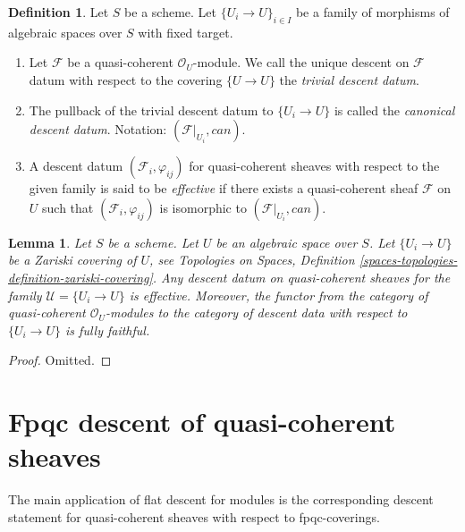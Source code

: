 \documentclass{stacks-project}
\theoremstyle{plain}
\newtheorem{lemma}[subsection]{Lemma}
\theoremstyle{definition}
\newtheorem{definition}[subsection]{Definition}
\theoremstyle{remark}
\numberwithin{equation}{subsection}
\begin{document}
\begin{definition}
\label{definition-descent-datum-effective-quasi-coherent}
Let $S$ be a scheme.
Let $\{U_i \to U\}_{i \in I}$ be a family of morphisms of algebraic
spaces over $S$ with fixed target.
\begin{enumerate}
\item Let $\mathcal{F}$ be a quasi-coherent $\mathcal{O}_U$-module.
We call the unique descent on $\mathcal{F}$ datum with respect to the covering
$\{U \to U\}$ the {\it trivial descent datum}.
\item The pullback of the trivial descent datum to
$\{U_i \to U\}$ is called the {\it canonical descent datum}.
Notation: $(\mathcal{F}|_{U_i}, can)$.
\item A descent datum $(\mathcal{F}_i, \varphi_{ij})$
for quasi-coherent sheaves with respect to the given family
is said to be {\it effective} if there exists a quasi-coherent
sheaf $\mathcal{F}$ on $U$ such that $(\mathcal{F}_i, \varphi_{ij})$
is isomorphic to $(\mathcal{F}|_{U_i}, can)$.
\end{enumerate}
\end{definition}

\begin{lemma}
\label{lemma-zariski-descent-effective}
Let $S$ be a scheme. Let $U$ be an algebraic space over $S$.
Let $\{U_i \to U\}$ be a Zariski covering of $U$, see
Topologies on Spaces,
Definition \ref{spaces-topologies-definition-zariski-covering}.
Any descent datum on quasi-coherent sheaves
for the family $\mathcal{U} = \{U_i \to U\}$ is
effective. Moreover, the functor from the category of
quasi-coherent $\mathcal{O}_U$-modules to the category
of descent data with respect to $\{U_i \to U\}$ is fully faithful.
\end{lemma}

\begin{proof}
Omitted.
\end{proof}












\section{Fpqc descent of quasi-coherent sheaves}
\label{section-fpqc-descent-quasi-coherent}

\noindent
The main application of flat descent for modules is
the corresponding descent statement for quasi-coherent
sheaves with respect to fpqc-coverings.
\end{document}
